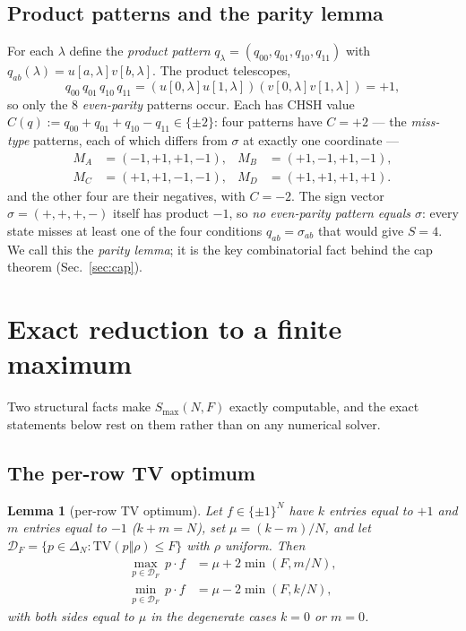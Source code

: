 \documentclass[aps,pra,reprint,superscriptaddress,floatfix]{revtex4-2}
\newcommand{\TV}{\mathrm{TV}}
\newtheorem{lemma}{Lemma}
\begin{document}
\subsection{Product patterns and the parity lemma}
For each $\lambda$ define the \emph{product pattern}
$q_\lambda=(q_{00},q_{01},q_{10},q_{11})$ with $q_{ab}(\lambda)=u[a,\lambda]v[b,\lambda]$.
The product telescopes,
\begin{equation}
q_{00}\,q_{01}\,q_{10}\,q_{11}
= (u[0,\lambda]u[1,\lambda])(v[0,\lambda]v[1,\lambda]) = +1,
\label{eq:parity}
\end{equation}
so only the $8$ \emph{even-parity} patterns occur. Each has CHSH value
$C(q):=q_{00}+q_{01}+q_{10}-q_{11}\in\{\pm2\}$: four patterns have
$C=+2$ --- the \emph{miss-type} patterns, each of which differs from $\sigma$
at exactly one coordinate ---
\begin{equation}
\begin{aligned}
M_A&=(-1,+1,+1,-1), & M_B&=(+1,-1,+1,-1),\\
M_C&=(+1,+1,-1,-1), & M_D&=(+1,+1,+1,+1).
\end{aligned}
\label{eq:miss}
\end{equation}
and the other four are their negatives, with $C=-2$.
The sign vector $\sigma=(+,+,+,-)$ itself has product $-1$, so \emph{no
even-parity pattern equals $\sigma$}: every state misses at least one of the
four conditions $q_{ab}=\sigma_{ab}$ that would give $S=4$. We call this the
\emph{parity lemma}; it is the key combinatorial fact behind the cap
theorem (Sec.~\ref{sec:cap}).

\section{Exact reduction to a finite maximum}
\label{sec:reduction}

Two structural facts make $S_{\max}(N,F)$ exactly computable, and the exact
statements below rest on them rather than on any numerical solver.

\subsection{The per-row TV optimum}

\begin{lemma}[per-row TV optimum]
\label{lem:tvropt}
Let $f\in\{\pm1\}^N$ have $k$ entries equal to $+1$ and $m$ entries equal to
$-1$ ($k+m=N$), set $\mu=(k-m)/N$, and let
$\mathcal{D}_F=\{p\in\Delta_N:\TV(p\Vert\rho)\le F\}$ with $\rho$ uniform.
Then
\begin{equation}
\begin{aligned}
\max_{p\in\mathcal{D}_F}\, p\!\cdot\! f &= \mu + 2\min(F,m/N),\\
\min_{p\in\mathcal{D}_F}\, p\!\cdot\! f &= \mu - 2\min(F,k/N),
\end{aligned}
\label{eq:lemma1}
\end{equation}
with both sides equal to $\mu$ in the degenerate cases $k=0$ or $m=0$.
\end{lemma}
\end{document}
